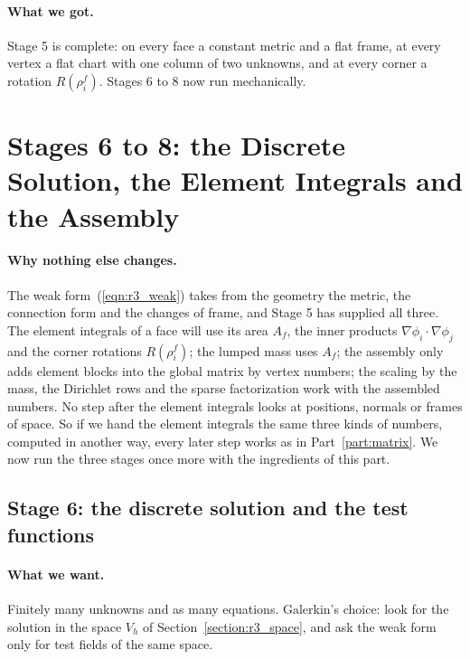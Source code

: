 \paragraph{What we got.} Stage 5 is complete: on every face a constant metric and a flat frame, at every vertex a flat chart with one column of two unknowns, and at every corner a rotation $R(\rho_i^f)$. Stages 6 to 8 now run mechanically.

\section{Stages 6 to 8: the Discrete Solution, the Element Integrals and the Assembly}
\label{section:int_fem}

\paragraph{Why nothing else changes.} The weak form~(\ref{eqn:r3_weak}) takes from the geometry the metric, the connection form and the changes of frame, and Stage 5 has supplied all three. The element integrals of a face will use its area $A_f$, the inner products $\nabla\phi_i\cdot\nabla\phi_j$ and the corner rotations $R(\rho_i^f)$; the lumped mass uses $A_f$; the assembly only adds element blocks into the global matrix by vertex numbers; the scaling by the mass, the Dirichlet rows and the sparse factorization work with the assembled numbers. No step after the element integrals looks at positions, normals or frames of space. So if we hand the element integrals the same three kinds of numbers, computed in another way, every later step works as in Part~\ref{part:matrix}. We now run the three stages once more with the ingredients of this part.

\subsection{Stage 6: the discrete solution and the test functions}
\label{section:r3_stage6}

\paragraph{What we want.} Finitely many unknowns and as many equations. Galerkin's choice: look for the solution in the space $V_h$ of Section~\ref{section:r3_space}, and ask the weak form only for test fields of the same space.

